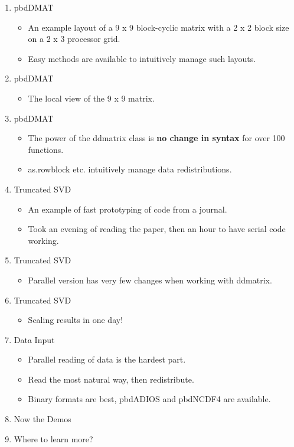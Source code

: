 \documentclass{article}
\begin{document}
\begin{enumerate}
\item pbdDMAT
  \begin{itemize}
  \item An example layout of a 9 x 9 block-cyclic matrix with a 2 x 2
    block size on a 2 x 3 processor grid.
  \item Easy methods are available to intuitively manage such layouts.
  \end{itemize}
\item pbdDMAT
  \begin{itemize}
  \item The local view of the 9 x 9 matrix.
  \end{itemize}
\item pbdDMAT
  \begin{itemize}
  \item The power of the ddmatrix class is {\bf no change in syntax} for
    over 100 functions.
  \item as.rowblock etc. intuitively manage data redistributions.
  \end{itemize}
\item Truncated SVD
  \begin{itemize}
  \item An example of fast prototyping of code from a journal.
  \item Took an evening of reading the paper, then an hour to have
    serial code working.
  \end{itemize}
\item Truncated SVD
  \begin{itemize}
  \item Parallel version has very few changes when working with ddmatrix.
  \end{itemize}
\item Truncated SVD
  \begin{itemize}
  \item Scaling results in one day!
  \end{itemize}
\item Data Input
  \begin{itemize}
  \item Parallel reading of data is the hardest part.
  \item Read the most natural way, then redistribute.
  \item Binary formats are best, pbdADIOS and pbdNCDF4 are available.
  \end{itemize}
\item Now the Demos
\item Where to learn more?
\end{enumerate}
\end{document}
